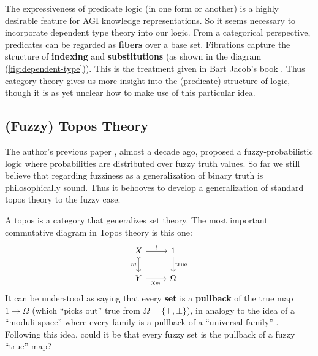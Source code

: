 \documentclass[orivec]{llncs}
\begin{document}
The expressiveness of predicate logic (in one form or another) is a highly desirable feature for AGI knowledge representations.  So it seems necessary to incorporate dependent type theory into our logic.  From a categorical perspective, predicates can be regarded as \textbf{fibers} over a base set.  Fibrations capture the structure of \textbf{indexing} and \textbf{substitutions} (as shown in the diagram (\ref{fig:dependent-type})).  This is the treatment given in Bart Jacob's book \cite{Jacobs1999}.  Thus category theory gives us more insight into the (predicate) structure of logic, though it is as yet unclear how to make use of this particular idea.
%
%

\subsection{(Fuzzy) Topos Theory}

The author's previous paper \cite{Yan2012}, almost a decade ago, proposed a fuzzy-probabilistic logic where probabilities are distributed over fuzzy truth values.  So far we still believe that regarding fuzziness as a generalization of binary truth is philosophically sound.  Thus it behooves to develop a generalization of standard topos theory to the fuzzy case.  

A topos is a category that generalizes set theory.  The most important commutative diagram in Topos theory is this one:
\begin{equation}
\label{eqn:subobject-classifier}
\begin{tikzcd}[column sep = normal]
X \arrow[r, "!"] \arrow[d, tail, swap, "m"] & 1 \arrow[d, "\mathrm{true}"] \\
Y \arrow[r, swap, "\chi_m"] & \Omega
\end{tikzcd}
\end{equation}
It can be understood as saying that every \textbf{set} is a \textbf{pullback} of the true map $1 \rightarrow \Omega$ (which ``picks out'' true from $\Omega = \{ \top, \bot \}$), in analogy to the idea of a ``moduli space'' where every family is a pullback of a ``universal family'' \cite{Schlichenmaier2010} \cite{Harris2006}.  Following this idea, could it be that every fuzzy set is the pullback of a fuzzy ``true'' map?  
\end{document}
